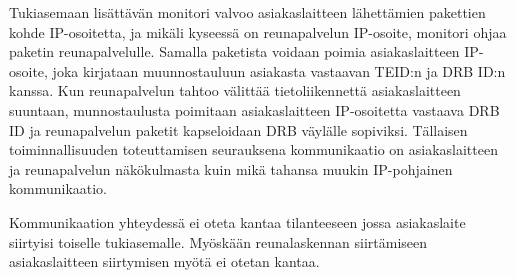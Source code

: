 Tukiasemaan lisättävän monitori valvoo asiakaslaitteen lähettämien pakettien kohde IP-osoitetta, ja mikäli kyseessä on reunapalvelun IP-osoite, monitori ohjaa paketin reunapalvelulle.
Samalla paketista voidaan poimia asiakaslaitteen IP-osoite, joka kirjataan muunnostauluun asiakasta vastaavan TEID:n ja DRB ID:n kanssa.
Kun reunapalvelun tahtoo välittää tietoliikennettä asiakaslaitteen suuntaan, munnostaulusta poimitaan asiakaslaitteen IP-osoitetta vastaava DRB ID ja reunapalvelun paketit kapseloidaan DRB väylälle sopiviksi.
Tällaisen toiminnallisuuden toteuttamisen seurauksena kommunikaatio on asiakaslaitteen ja reunapalvelun näkökulmasta kuin mikä tahansa muukin IP-pohjainen kommunikaatio.

Kommunikaation yhteydessä ei oteta kantaa tilanteeseen jossa asiakaslaite siirtyisi toiselle tukiasemalle. Myöskään reunalaskennan siirtämiseen asiakaslaitteen siirtymisen myötä ei otetan kantaa.
%
%

